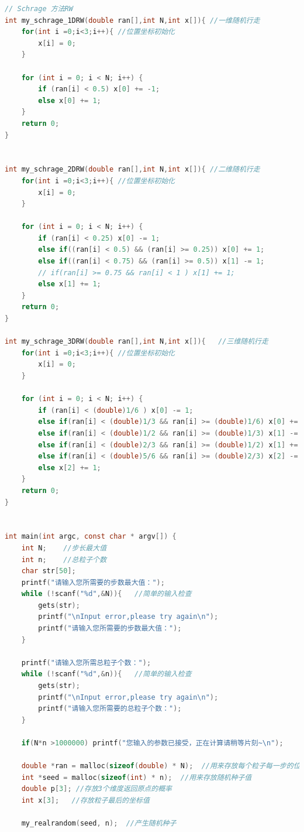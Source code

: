 \documentclass[a4paper,11pt]{article}
\begin{document}
\begin{appendices}
\begin{lstlisting}[language = C]
// Schrage 方法RW
int my_schrage_1DRW(double ran[],int N,int x[]){ //一维随机行走
    for(int i =0;i<3;i++){ //位置坐标初始化
        x[i] = 0;
    }
    
    for (int i = 0; i < N; i++) {
        if (ran[i] < 0.5) x[0] += -1;
        else x[0] += 1;
    }
    return 0;
}


int my_schrage_2DRW(double ran[],int N,int x[]){ //二维随机行走
    for(int i =0;i<3;i++){ //位置坐标初始化
        x[i] = 0;
    }
    
    for (int i = 0; i < N; i++) {
        if (ran[i] < 0.25) x[0] -= 1;
        else if((ran[i] < 0.5) && (ran[i] >= 0.25)) x[0] += 1;
        else if((ran[i] < 0.75) && (ran[i] >= 0.5)) x[1] -= 1;
        // if(ran[i] >= 0.75 && ran[i] < 1 ) x[1] += 1;
        else x[1] += 1;
    }
    return 0;
}

int my_schrage_3DRW(double ran[],int N,int x[]){   //三维随机行走
    for(int i =0;i<3;i++){ //位置坐标初始化
        x[i] = 0;
    }
    
    for (int i = 0; i < N; i++) {
        if (ran[i] < (double)1/6 ) x[0] -= 1;
        else if(ran[i] < (double)1/3 && ran[i] >= (double)1/6) x[0] += 1;
        else if(ran[i] < (double)1/2 && ran[i] >= (double)1/3) x[1] -= 1;
        else if(ran[i] < (double)2/3 && ran[i] >= (double)1/2) x[1] += 1;
        else if(ran[i] < (double)5/6 && ran[i] >= (double)2/3) x[2] -= 1;
        else x[2] += 1;
    }
    return 0;
}


int main(int argc, const char * argv[]) {
    int N;    //步长最大值
    int n;    //总粒子个数
    char str[50];
    printf("请输入您所需要的步数最大值：");
    while (!scanf("%d",&N)){   //简单的输入检查
        gets(str);
        printf("\nInput error,please try again\n");
        printf("请输入您所需要的步数最大值：");
    }
    
    printf("请输入您所需总粒子个数：");
    while (!scanf("%d",&n)){   //简单的输入检查
        gets(str);
        printf("\nInput error,please try again\n");
        printf("请输入您所需要的总粒子个数：");
    }
    
    if(N*n >1000000) printf("您输入的参数已接受，正在计算请稍等片刻~\n");

    double *ran = malloc(sizeof(double) * N);  //用来存放每个粒子每一步的位置
    int *seed = malloc(sizeof(int) * n);  //用来存放随机种子值
    double p[3]; //存放3个维度返回原点的概率
    int x[3];   //存放粒子最后的坐标值
    
    my_realrandom(seed, n);  //产生随机种子
    

\end{lstlisting}
\end{appendices}
\end{document}
